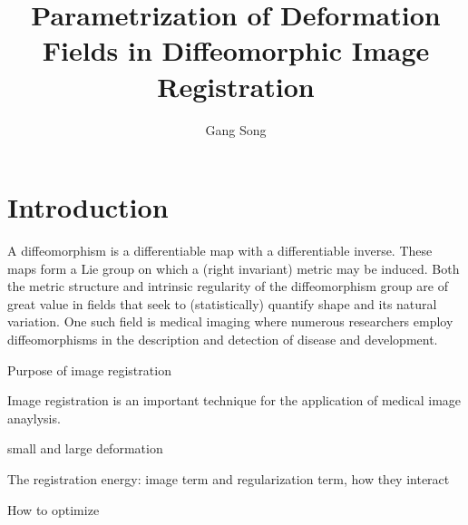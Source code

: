 \documentclass[letterpaper,12pt]{article}
\title{Parametrization of Deformation Fields in Diffeomorphic Image Registration}
\author{Gang Song}
\date{}
\begin{document}
\maketitle
\begin{abstract}
\end{abstract}



\section{Introduction}
\label{sec:intro}





A diffeomorphism is a differentiable map with a differentiable
inverse.  These maps form a Lie group on which a (right invariant)
metric may be induced.  Both the metric structure and intrinsic
regularity of the diffeomorphism group are of great value in fields
that seek to (statistically) quantify shape and its natural variation.
One such field is medical imaging where numerous researchers employ
diffeomorphisms in the description and detection of disease and
development.  


Purpose of image registration


Image registration is an important technique for the application of medical image anaylysis. 

small and large deformation 

The registration energy: image term and regularization term, how they interact

How to optimize







\end{document}
